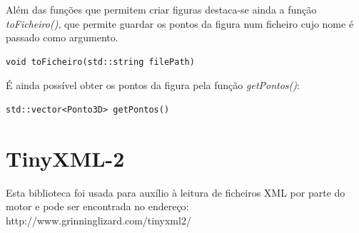 Além das funções que permitem criar figuras destaca-se ainda a função \textit{toFicheiro()}, que permite guardar os pontos da figura num ficheiro cujo nome é passado como argumento.

\begin{Verbatim}
void toFicheiro(std::string filePath)
\end{Verbatim}

É ainda possível obter os pontos da figura pela função \textit{getPontos()}:

\begin{Verbatim}
std::vector<Ponto3D> getPontos()
\end{Verbatim}

\section{TinyXML-2}

Esta biblioteca foi usada para auxílio à leitura de ficheiros XML por parte do motor e pode ser encontrada no endereço: http://www.grinninglizard.com/tinyxml2/
